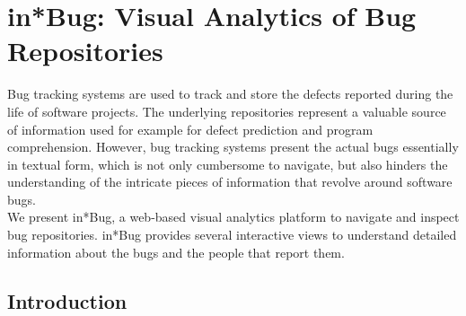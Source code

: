 


\newcommand{\ie}{\textit{i.e.,}\xspace}
\newcommand{\eg}{\textit{e.g.,}\xspace}
\newcommand{\etc}{\textit{etc.}\xspace}
\newcommand{\etal}{\textit{et al.}\xspace}
\newcommand{\ib}{in*Bug\xspace}
\newcommand{\secref}[1]{Section~\ref{#1}\xspace}
\newcommand{\figref}[1]{Figure~\ref{#1}\xspace}
\newcommand{\tabref}[1]{Table~\ref{#1}\xspace}


\chapter{in*Bug: Visual Analytics of Bug Repositories}


Bug tracking systems are used to track and store the defects reported during the life of software projects. The underlying repositories represent a valuable source of information used for example for defect prediction and program comprehension. However, bug tracking systems present the actual bugs essentially in textual form, which is not only cumbersome to navigate, but also hinders the understanding of the intricate pieces of information that revolve around software bugs.\\
We present in*Bug, a web-based visual analytics platform to navigate and inspect bug repositories. in*Bug provides several interactive views to understand detailed information about the bugs and the people that report them. \\

\section{Introduction}

